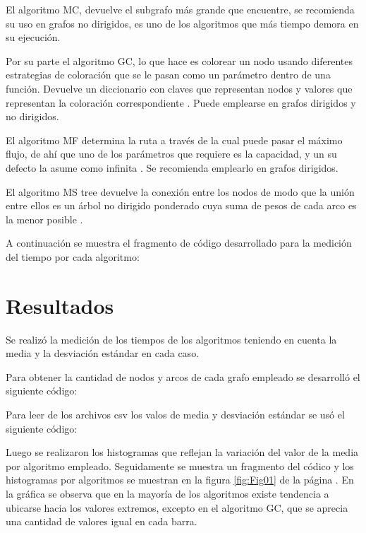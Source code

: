 \documentclass{article}
\begin{document}
El algoritmo MC, devuelve el subgrafo más grande que encuentre, se recomienda su uso en grafos no dirigidos, es uno de los algoritmos que más tiempo demora en su ejecución.  

Por su parte el algoritmo GC, lo que hace es colorear un nodo usando diferentes estrategias de coloración que se le pasan como un parámetro dentro de una función.  Devuelve un diccionario con claves que representan nodos y valores que representan la coloración correspondiente \cite{gredy}. Puede emplearse en grafos dirigidos y no dirigidos.

El algoritmo MF determina la ruta a través de la cual puede pasar el máximo flujo, de ahí que uno de los parámetros que requiere es la capacidad, y un su defecto la asume como infinita \cite{mf}. Se recomienda emplearlo en grafos dirigidos.

El algoritmo MS tree devuelve la conexión entre los nodos de modo que la unión entre ellos es un árbol no dirigido ponderado cuya suma de pesos de cada arco es la menor posible \cite{min}.

A continuación se muestra el fragmento de código desarrollado para la medición del tiempo por cada algoritmo:




\section{Resultados} 

Se realizó la medición de los tiempos de los algoritmos teniendo en cuenta la media y la desviación estándar en cada caso. 

Para obtener la cantidad de nodos y arcos de cada grafo empleado se desarrolló el siguiente código:

\newpage


Para leer de los archivos csv los valos de media y desviación estándar se usó el siguiente código:

\newpage


Luego se realizaron los histogramas que reflejan la variación del valor de la media por algoritmo empleado. Seguidamente se muestra un fragmento del códico y los histogramas por algoritmos se muestran en la figura \ref{fig:Fig01} de la página \pageref{fig:Fig01}. En la gráfica se observa que en la mayoría de los algoritmos existe tendencia a ubicarse hacia los valores extremos, excepto en el algoritmo GC, que se aprecia una cantidad de valores igual en cada barra.
\end{document}

